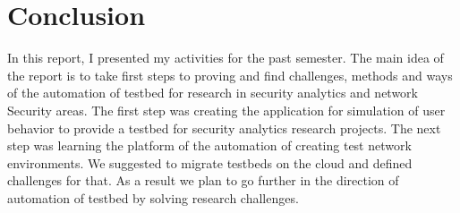 
\section{Conclusion}

In this report, I presented my activities for the past semester. The main idea of the report is to take first steps to proving and find challenges, methods and ways of the automation of testbed for research in security analytics and network Security areas. The first step was creating the application for simulation of user behavior to provide a testbed for security analytics research projects. The next step was learning the platform of the automation of creating test network environments. We suggested to migrate testbeds on the cloud and defined challenges for that. As a result we plan to go further in the direction of automation of testbed by solving research challenges.